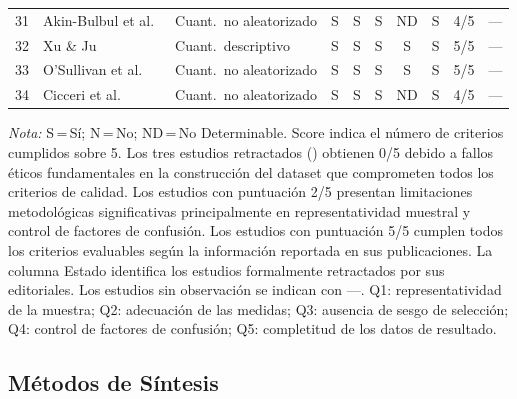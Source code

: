 \documentclass[ASNA,twocolumn]{USG}
\begin{document}
\begin{table}[!ht]
{\begin{tabular*}{\textwidth}{@{\extracolsep\fill}clllcccccl@{\extracolsep\fill}}
				31 & Akin-Bulbul et al.\ \cite{AkinBulbul2024}   & Cuant.\ no aleatorizado & S  & S  & S  & ND & S  & 4/5 & --- \\
				32 & Xu \& Ju \cite{Xu2023}                       & Cuant.\ descriptivo     & S  & S  & S  & S  & S  & 5/5 & --- \\
				33 & O'Sullivan et al.\ \cite{OSullivan2023}      & Cuant.\ no aleatorizado & S  & S  & S  & S  & S  & 5/5 & --- \\
				34 & Cicceri et al.\ \cite{Cicceri2026}           & Cuant.\ no aleatorizado & S  & S  & S  & ND & S  & 4/5 & --- \\
				\bottomrule
		\end{tabular*}}
		\begin{tablenotes}
			\item {\it Nota:} S\,=\,Sí; N\,=\,No; ND\,=\,No Determinable. Score indica el
			número de criterios cumplidos sobre 5. Los tres estudios retractados
			(\cite{Gungor2025,Mahmood2025,Kumar2024}) obtienen 0/5 debido a fallos éticos
			fundamentales en la construcción del dataset que comprometen todos los criterios
			de calidad. Los estudios con puntuación 2/5 presentan limitaciones metodológicas
			significativas principalmente en representatividad muestral y control de factores
			de confusión. Los estudios con puntuación 5/5 cumplen todos los criterios
			evaluables según la información reportada en sus publicaciones. La columna Estado
			identifica los estudios formalmente retractados por sus editoriales. Los estudios
			sin observación se indican con ---. Q1: representatividad de la muestra;
			Q2: adecuación de las medidas; Q3: ausencia de sesgo de selección; Q4: control de
			factores de confusión; Q5: completitud de los datos de resultado.
		\end{tablenotes}
	\end{table}
	
	\subsection{Métodos de Síntesis}\label{sec2g}
	
\end{document}
